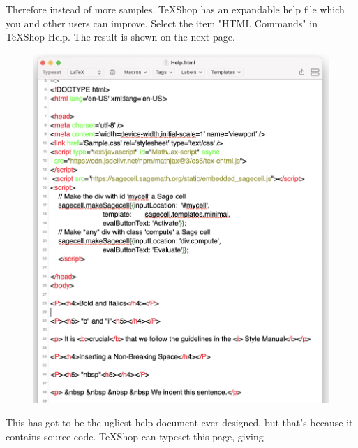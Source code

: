 \documentclass[11pt, oneside]{article}   	%
\begin{document}
Therefore instead of more samples, TeXShop has an expandable help file which you and other users can improve. 
Select the item "HTML Commands" in TeXShop Help.  The result is shown on the next page.
\begin{figure}[H] %
     \hspace{.2in}  \includegraphics[width=6in.]{Graphics/shot14.png} %
\end{figure}

This has got to be the ugliest help document ever designed, but that's because it contains source code. TeXShop can typeset this page, giving
\end{document}
